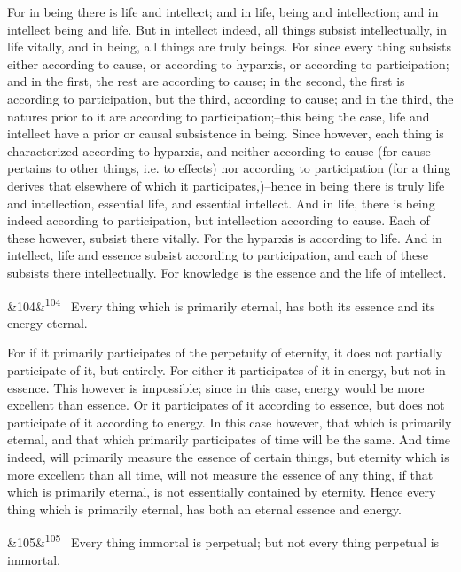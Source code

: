 \documentclass[12pt]{article}
\newcommand{\para}[1][]{\par\noindent\ifx&#1&\else\textsuperscript{\footnotesize #1}~\fi}
\begin{document}
For in being there is life and intellect; and in life, being and intellection; and in intellect being and life. But in intellect indeed, all things subsist intellectually, in life vitally, and in being, all things are truly beings. For since every thing subsists either according to cause, or according to hyparxis, or according to participation; and in the first, the rest are according to cause; in the second, the first is according to participation, but the third, according to cause; and in the third, the natures prior to it are according to participation;--this being the case, life and intellect have a prior or causal subsistence in being. Since however, each thing is characterized according to hyparxis, and neither according to cause (for cause pertains to other things, i.e. to effects) nor according to participation (for a thing derives that elsewhere of which it participates,)--hence in being there is truly life and intellection, essential life, and essential intellect. And in life, there is being indeed according to participation, but intellection according to cause. Each of these however, subsist there vitally. For the hyparxis is according to life. And in intellect, life and essence subsist according to participation, and each of these subsists there intellectually. For knowledge is the essence and the life of intellect.

\para[104] Every thing which is primarily eternal, has both its essence and its energy eternal.

For if it primarily participates of the perpetuity of eternity, it does not partially participate of it, but entirely. For either it participates of it in energy, but not in essence. This however is impossible; since in this case, energy would be more excellent than essence. Or it participates of it according to essence, but does not participate of it according to energy. In this case however, that which is primarily eternal, and that which primarily participates of time will be the same. And time indeed, will primarily measure the essence of certain things, but eternity which is more excellent than all time, will not measure the essence of any thing, if that which is primarily eternal, is not essentially contained by eternity. Hence every thing which is primarily eternal, has both an eternal essence and energy.

\para[105] Every thing immortal is perpetual; but not every thing perpetual is immortal.
\end{document}
